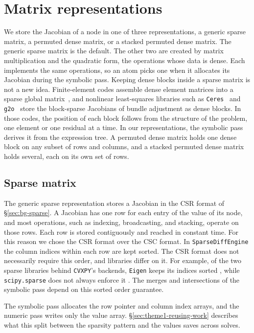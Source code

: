 \section{Matrix representations}\label{sec:theme1-matrix-representations}
We store the Jacobian of a node in one of three representations, a generic sparse matrix, a
permuted dense matrix, or a stacked permuted dense matrix. The generic sparse matrix is the
default. The other two are created by matrix multiplication and the quadratic form, the
operations whose data is dense. Each implements the same operations, so an atom picks one
when it allocates its Jacobian during the symbolic pass.
Keeping dense blocks inside a sparse matrix is not a new idea. Finite-element codes
assemble dense element matrices into a sparse global matrix~\cite{hughes2000fem}, and nonlinear least-squares
libraries such as \texttt{Ceres}~\cite{agarwal2023ceres} and \texttt{g2o}~\cite{kummerle2011g2o}
store the block-sparse Jacobians of bundle adjustment as dense blocks.
In those codes, the position of each block follows from the structure of the problem, one
element or one residual at a time. In our representations, the symbolic pass derives it from
the expression tree. A permuted dense matrix holds one dense block on any subset of rows and
columns, and a stacked permuted dense matrix holds several, each on its own set of rows.

\subsection{Sparse matrix}\label{sec:theme1-generic-sparse}

The generic sparse representation stores a Jacobian in the CSR format of
\S\ref{sec:bg-sparse}. A Jacobian has one row for each entry of the value of its node,
and most operations, such as
indexing, broadcasting, and stacking, operate on those rows. Each row is stored contiguously
and reached in constant time.
For this reason we chose the CSR format over the CSC format.
In \texttt{SparseDiffEngine} the column indices within each row are kept sorted. The CSR
format does not necessarily require this order, and libraries differ on it. For example, of
the two sparse libraries behind \texttt{CVXPY}'s backends, \texttt{Eigen} keeps its indices
sorted \cite{guennebaud2010eigen}, while \texttt{scipy.sparse} does not always enforce it
\cite{2020SciPy-NMeth}. The merges
and intersections of the symbolic pass depend on this sorted order guarantee.

The symbolic pass allocates the row pointer and column index arrays, and the numeric pass
writes only the value array. \S\ref{sec:theme1-reusing-work} describes what this split
between the sparsity pattern and the values saves across solves.

